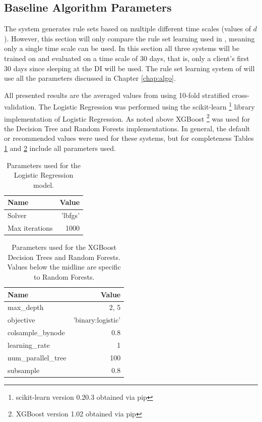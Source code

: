\subsection{Baseline Algorithm Parameters}
The \Abb system generates rule sets based on multiple different time scales (values of $d$). However, this section will only compare the rule set learning used in \Abb, meaning only a single time scale can be used. In this section all three systems will be trained on and evaluated on a time scale of 30 days, that is, only a client's first 30 days since sleeping at the DI will be used. 
The rule set learning system of \Abb will use all the parameters discussed in Chapter \ref{chap:algo}.

All presented results are the averaged values from using 10-fold stratified cross-validation. 
The Logistic Regression was performed using the scikit-learn \footnote{scikit-learn version 0.20.3 obtained via pip} library implementation of Logistic Regression. As noted above XGBoost \footnote{XGBoost version 1.02 obtained via pip} was used for the Decision Tree and Random Forests implementations. In general, the default or recommended values were used for these systems, but for completeness Tables \ref{tbl:results:lrparam} and \ref{tbl:results:xgbparam} include all parameters used.

\begin{table}[h]
	\centering

	\begin{tabular}{lr}
	\toprule
	{Name} &    Value \\
	\midrule
	Solver & 'lbfgs' \\
	Max iterations & 1000 \\
	\bottomrule
	\end{tabular}

	\caption{Parameters used for the Logistic Regression model.}
	\label{tbl:results:lrparam}
\end{table}

\begin{table}[h]
	\centering

	\begin{tabular}{lr}
	\toprule
	{Name} &    Value \\
	\midrule
	max\_depth & 2, 5 \\
	objective & 'binary:logistic' \\
	\midrule
	colsample\_bynode & 0.8 \\
	learning\_rate & 1 \\
	num\_parallel\_tree & 100 \\
	subsample & 0.8 \\
	\bottomrule
	\end{tabular}

	\caption{Parameters used for the XGBoost Decision Trees and Random Forests. Values below the midline are specific to Random Forests.}
	\label{tbl:results:xgbparam}
\end{table}


